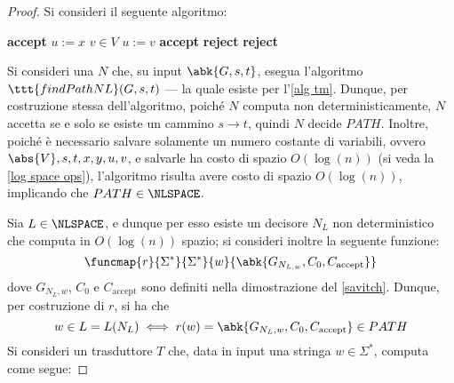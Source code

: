 \documentclass[a4paper, 12pt]{report}
\begin{document}
    \begin{proof}
        Si consideri il seguente algoritmo:

        \begin{algorithmic}[1]
                    \State \textbf{accept}
                \EndIf
                \State $u := x$
                \For{$\_ \in [1, \abs{V}]$} 
                    \State $v \in V$ 
                        \State $u := v$
                            \State \textbf{accept}
                        \EndIf
                    \Else
                        \State \textbf{reject} 
                    \EndIf
                \EndFor
                \State \textbf{reject} 
            \EndFunction
        \end{algorithmic}

        Si consideri una \NTM $N$ che, su input $\abk{G, s, t}$, esegua l'algoritmo $\ttt{findPathNL}(G, s, t)$ --- la quale esiste per l'\cref{alg tm}. Dunque, per costruzione stessa dell'algoritmo, poiché $N$ computa non deterministicamente, $N$ accetta se e solo se esiste un cammino $s \to t$, quindi $N$ decide $PATH$. Inoltre, poiché è necessario salvare solamente un numero costante di variabili, ovvero $\abs{V}, s, t, x, y, u, v$, e salvarle ha costo di spazio $O(\log(n))$ (si veda la \cref{log space ops}), l'algoritmo risulta avere costo di spazio $O(\log(n))$, implicando che $PATH \in \NLSPACE$.

        Sia $L \in \NLSPACE$, e dunque per esso esiste un decisore $N_L$ non deterministico che computa in $O(\log(n))$ spazio; si consideri inoltre la seguente funzione: $$\funcmap{r}{\Sigma^*}{\Sigma^*}{w}{\abk{G_{N_{L, w}}, C_0, C_\mathrm{accept}}}$$ dove $G_{N_L, w}$, $C_0$ e $C_\mathrm{accept}$ sono definiti nella dimostrazione del \cref{savitch}. Dunque, per costruzione di $r$, si ha che $$w \in L = L(N_L) \iff r(w) = \abk{G_{N_L, w}, C_0, C_\mathrm{accept}} \in PATH$$ Si consideri un trasduttore $T$ che, data in input una stringa $w \in \Sigma^*$, computa come segue:


\end{proof}
\end{document}
